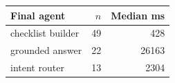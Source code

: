 \begin{tabular}{@{}lrr@{}}
\toprule
Final agent & $n$ & Median ms \\
\midrule
checklist builder & 49 & 428 \\
grounded answer & 22 & 26163 \\
intent router & 13 & 2304 \\
\bottomrule
\end{tabular}